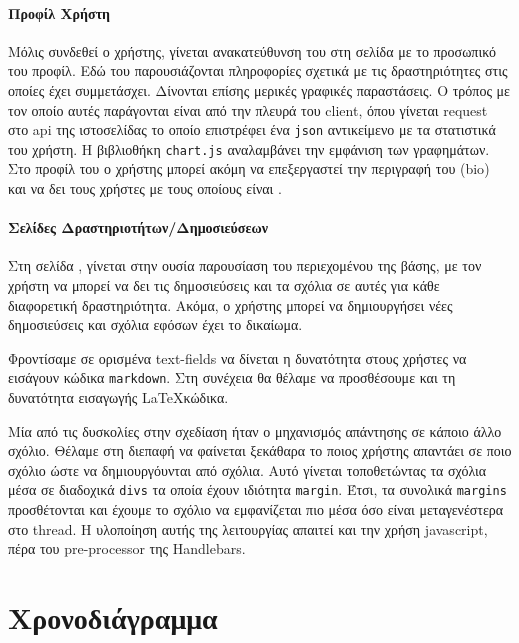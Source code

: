 \documentclass[nonacm, language=english, language=greek]{acmart}
\newcommand{\en}[1]{\textlatin{#1}}
\newcommand{\src}[1]{\texttt{\en{#1}}}
\begin{document}
\paragraph{Προφίλ Χρήστη}

Μόλις συνδεθεί ο χρήστης, γίνεται ανακατεύθυνση του 
στη σελίδα με το προσωπικό του προφίλ. Εδώ του 
παρουσιάζονται πληροφορίες σχετικά με τις δραστηριότητες 
στις οποίες έχει συμμετάσχει. 
Δίνονται επίσης μερικές γραφικές παραστάσεις. Ο τρόπος με τον οποίο 
αυτές παράγονται είναι από την πλευρά του \en{client}, όπου γίνεται 
\en{request} στο \en{api} της ιστοσελίδας το οποίο επιστρέφει 
ένα \src{json} αντικείμενο με τα στατιστικά του χρήστη. 
Η βιβλιοθήκη \src{chart.js} \cite{ChartJS}
αναλαμβάνει την εμφάνιση των γραφημάτων.
Στο προφίλ του ο χρήστης μπορεί ακόμη να επεξεργαστεί την περιγραφή του 
(\en{bio}) και να δει τους χρήστες με τους οποίους είναι .

\paragraph{Σελίδες Δραστηριοτήτων/Δημοσιεύσεων}

Στη σελίδα \say{\en{Activities}}, γίνεται στην ουσία παρουσίαση του
περιεχομένου της βάσης, με τον χρήστη να μπορεί να δει τις δημοσιεύσεις και τα
σχόλια σε αυτές για κάθε διαφορετική δραστηριότητα. Ακόμα, ο χρήστης μπορεί να
δημιουργήσει νέες δημοσιεύσεις και σχόλια εφόσων έχει το δικαίωμα.

Φροντίσαμε σε ορισμένα \en{text-fields} να δίνεται η δυνατότητα 
στους χρήστες να εισάγουν κώδικα \src{markdown}. Στη συνέχεια 
θα θέλαμε να προσθέσουμε και τη δυνατότητα εισαγωγής \LaTeX κώδικα.

Μία από τις δυσκολίες στην σχεδίαση ήταν ο μηχανισμός απάντησης
σε κάποιο άλλο σχόλιο. Θέλαμε στη διεπαφή να φαίνεται 
ξεκάθαρα το ποιος χρήστης απαντάει σε ποιο σχόλιο
ώστε να δημιουργόυνται  από σχόλια.
Αυτό γίνεται τοποθετώντας τα σχόλια μέσα σε διαδοχικά \src{divs}
τα οποία έχουν ιδιότητα \src{margin}. Έτσι, τα συνολικά 
\src{margins} προσθέτονται και έχουμε το σχόλιο να εμφανίζεται πιο μέσα 
όσο είναι μεταγενέστερα στο \en{thread}. Η υλοποίηση αυτής 
της λειτουργίας απαιτεί και την χρήση \en{javascript}, πέρα 
του \en{pre-processor} της \en{Handlebars}.

\section{Χρονοδιάγραμμα}
\end{document}
